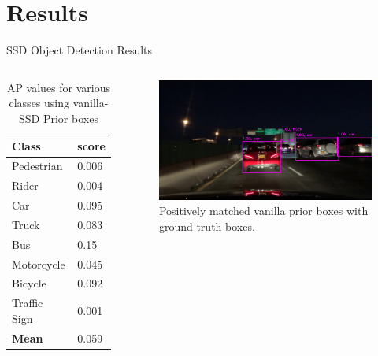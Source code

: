 \documentclass[10pt, aspectratio=169]{beamer}
\begin{document}
\section{Results}
\begin{frame}[allowframebreaks]{SSD Object Detection Results}

    \begin{columns}
            \begin{table}
                \caption{AP values for various classes using vanilla-SSD Prior boxes}
                \begin{tabular}{ll}
                    \hline
                        \textbf{Class} & \textbf{score} \\ \hline
                        Pedestrian     & 0.006              \\ \hline
                        Rider          & 0.004              \\ \hline
                        Car            & 0.095              \\ \hline
                        Truck          & 0.083              \\ \hline
                        Bus            & 0.15               \\ \hline 
                        Motorcycle     & 0.045              \\ \hline
                        Bicycle        & 0.092              \\ \hline
                        Traffic Sign   & 0.001              \\ \hline
                        \textbf{Mean}  & 0.059  \\\hline
                \end{tabular}
            \end{table}
            \begin{figure}[!ht]
                \centering
                \includegraphics[scale=0.175]{images/9.png}
                \caption[SSD framework]{Positively matched vanilla prior boxes with ground truth boxes.}
            \end{figure}
    \end{columns}


\end{frame}
\end{document}
